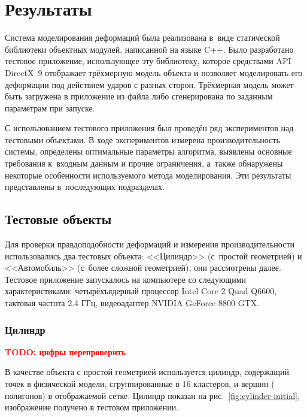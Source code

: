 \documentclass[a4paper, 14pt, titlepage]{extarticle}
\newcommand{\todo}[1]{\textbf{\textcolor{red}{TODO: #1}}}
\let\oldsection\section
\renewcommand{\section}{\newpage\oldsection}
\newcommand{\num}[1]{\numprint{#1}}
\begin{document}
  \section{Результаты}\label{sec:results}

    Система моделирования деформаций была реализована в~виде статической
    библиотеки объектных модулей, написанной на языке C++. Было разработано тестовое приложение,
    использующее эту библиотеку, которое средствами API DirectX~9 отображает трёхмерную модель
    объекта и позволяет моделировать его деформации под действием ударов с разных сторон. Трёхмерная
    модель может быть загружена в приложение из файла либо сгенерирована по заданным параметрам при
    запуске.

    С использованием тестового приложения был проведён ряд экспериментов над тестовыми объектами.
    В ходе экспериментов измерена производительность системы, определены оптимальные параметры алгоритма,
    выявлены основные требования к~входным данным и прочие ограничения, а~также обнаружены некоторые
    особенности используемого метода моделирования. Эти результаты представлены в~последующих подразделах.

    \subsection{Тестовые объекты}\label{ssec:test_objects}

      Для проверки правдоподобности деформаций и измерения производительности использовались два
      тестовых объекта: <<Цилиндр>> (с~простой геометрией) и <<Автомобиль>> (с~более сложной
      геометрией), они рассмотрены далее. Тестовое приложение запускалось на компьютере со следующими
      характеристиками: четырёхъядерный процессор Intel Core 2 Quad Q6600, тактовая частота 2.4 ГГц,
      видеоадаптер NVIDIA GeForce 8800 GTX.

      \subsubsection{Цилиндр}\label{sssec:cylinder}

        \todo{цифры перепроверить}

        В качестве объекта с простой геометрией используется цилиндр, содержащий
        \num{2400} точек в физической модели, сгруппированные в 16 кластеров, и \num{20000} вершин (\num{13500}
        полигонов) в отображаемой сетке. Цилиндр показан на рис.~\ref{fig:cylinder-initial},
        изображение получено в тестовом приложении.
\end{document}
